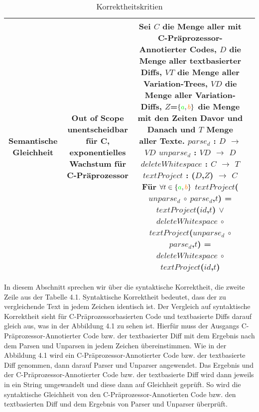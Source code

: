 \begin{table}[H]
\begin{center}
\begin{tabular}{ c||c|c|c| }
			\hline
			Semantische Gleichheit &  \parbox[][3cm][]{4cm}{Out of Scope\\
				unentscheidbar für C,\\
				exponentielles Wachstum für C-Präprozessor}  &  \parbox[][10.5cm][]{5cm}{Sei $C$ die Menge aller mit C-Präprozessor-Annotierter Codes, $D$ die Menge aller textbasierter Diffs, $VT$ die Menge aller Variation-Trees,  $VD$ die Menge aller Variation-Diffs, $Z$=$\{\textcolor{green}{a},\textcolor{orange}{b}\}$ die Menge mit den Zeiten Davor und Danach und $T$ Menge aller Texte.\\
				$parse_d$ : $D$ $\rightarrow$ $VD$\\
				$unparse_d$ : $VD$ $\rightarrow$ $D$\\
				$deleteWhitespace$ : $C$ $\rightarrow$ $T$\\
				$textProject$ : ($D$,$Z$) $\rightarrow$ $C$\\
				Für $\forall t \in \{\textcolor{green}{a},\textcolor{orange}{b}\}$\\
				$textProject$($unparse_d$ $\circ$ $parse_d$,$t$) = $textProject$($id$,$t$) $\lor$ $deleteWhitespace$ $\circ$ $textProject$($unparse_d$ $\circ$ $parse_d$,$t$) =  $deleteWhitespace$ $\circ$ $textProject$($id$,$t$)
			} \\
			\hline
		\end{tabular}
	\end{center}
	\caption{Korrektheitskritien}
\end{table}


In diesem Abschnitt sprechen wir über die syntaktische Korrektheit, die zweite Zeile aus der Tabelle 4.1. Syntaktische Korrektheit bedeutet, dass der zu vergleichende Text in jedem Zeichen identisch ist. Der Vergleich auf syntaktische Korrektheit sieht für C-Präprozessorbasierten Code und textbasierte Diffs darauf gleich aus, was in der Abbildung 4.1 zu sehen ist. Hierfür muss der Ausgangs C-Präprozessor-Annotierter Code bzw. der textbasierter Diff mit dem Ergebnis nach dem Parsen und Unparsen in jedem Zeichen übereinstimmen. Wie in der Abbildung 4.1 wird ein C-Präprozessor-Annotierter Code bzw. der textbasierte Diff genommen, dann darauf Parser und Unparser angewendet. Das Ergebnis und der C-Präprozessor-Annotierter Code bzw. der textbasierte Diff wird dann jeweils in ein String umgewandelt und diese dann auf Gleichheit geprüft. So wird die syntaktische Gleichheit von den C-Präprozessor-Annotierten Code bzw. den textbasierten Diff und dem Ergebnis von Parser und Unparser überprüft.

